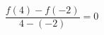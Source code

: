 \documentclass[preview]{standalone}
\begin{document}
\begin{align*}
\dfrac{f(4) - f(-2)}{4 - (-2)} = 0
\end{align*}
\end{document}
